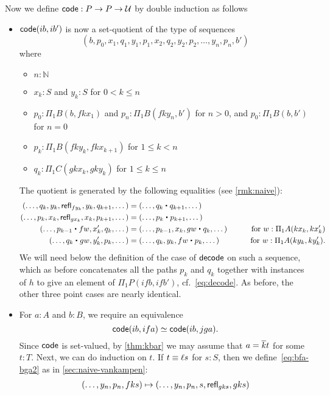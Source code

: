 Now we define $\mathsf{code}:P\to P\to \mathcal{U}$ by double induction as follows
\begin{itemize}
\item $\mathsf{code}(ib,ib')$ is now a set-quotient of the type of sequences
  \[ (b, p_0, x_1, q_1, y_1, p_1, x_2, q_2, y_2, p_2, \dots, y_n, p_n, b') \]
  where
  \begin{itemize}
  \item $n:\mathbb{N}$
  \item $x_k:S$ and $y_k:S$ for $0<k \le n$
  \item $p_0:\Pi_1B(b,f k x_1)$ and $p_n:\Pi_1B(f k y_n, b')$ for $n>0$, and $p_0:\Pi_1B(b,b')$ for $n=0$
  \item $p_k:\Pi_1B(fk y_k, fkx_{k+1})$ for $1\le k < n$
  \item $q_k:\Pi_1C(gkx_k, gky_k)$ for $1\le k\le n$
  \end{itemize}
  The quotient is generated by the following equalities (see \autoref{rmk:naive}):
  \begin{alignat*}{2}
    (\dots, q_k, y_k, \refl{fy_k}, y_k, q_{k+1},\dots)
    &= (\dots, q_k\ct q_{k+1},\dots)\\
    (\dots, p_k, x_k, \refl{gx_k}, x_k, p_{k+1},\dots)
    &= (\dots, p_k\ct p_{k+1},\dots)\\
    (\dots, p_{k-1} \ct fw, x_{k}', q_{k}, \dots) &=
    (\dots, p_{k-1}, x_{k}, gw \ct q_{k}, \dots)
    & \qquad\text{for } w:\Pi_1A(kx_{k},kx_{k}')\\
    (\dots, q_k \ct gw, y_k', p_k, \dots) &=
    (\dots, q_k, y_k, fw \ct p_k, \dots)
    & \qquad\text{for } w:\Pi_1A(ky_k, ky_k').
  \end{alignat*}
  We will need below the definition of the case of $\mathsf{decode}$ on such a sequence, which as before concatenates all the paths $p_k$ and $q_k$ together with instances of $h$ to give an element of $\Pi_1P(ifb,ifb')$, cf.~\eqref{eq:decode}.
  As before, the other three point cases are nearly identical.
\item For $a:A$ and $b:B$, we require an equivalence
  \begin{equation}
    \code(ib, ifa) \simeq \code(ib,jga).\label{eq:bfa-bga2}
  \end{equation}
  Since $\mathsf{code}$ is set-valued, by \autoref{thm:kbar} we may assume that $a=\overline{k} t$ for some $t:T$.
  Next, we can do induction on $t$.
  If $t\equiv \ell s$ for $s:S$, then we define~\eqref{eq:bfa-bga2} as in \autoref{sec:naive-vankampen}:
  \begin{align*}
    (\dots, y_n, p_n,fks) &\mapsto (\dots,y_n,p_n,s,\refl{gks},gks)\\

\end{align*}
\end{itemize}
